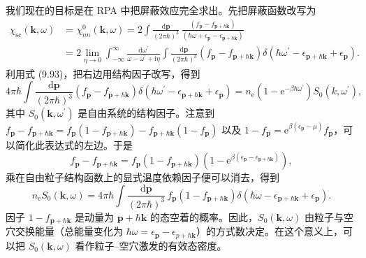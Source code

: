 我们现在的目标是在 RPA 中把屏蔽效应完全求出。先把屏蔽函数改写为
\begin{equation*}
\begin{aligned}
\chi_{\mathrm{sc}}(\mathbf{k},\omega)&=\chi_{nn}^{0}(\mathbf{k},\omega)=2\int\frac{\mathrm{d}\mathbf{p}}{(2\pi\hbar)^3}\,\frac{\left(f_{\mathbf{p}}-f_{\mathbf{p}+\hbar\mathbf{k}}\right)}{\left(\hbar\omega+\epsilon_{\mathbf{p}}-\epsilon_{\mathbf{p}+\hbar\mathbf{k}}\right)}\\
&=2\lim_{\eta\to 0}\int_{-\infty}^{\infty}\frac{\mathrm{d}\omega^{\prime}}{\omega-\omega^{\prime}+\mathrm{i}\eta}\int\frac{\mathrm{d}\mathbf{p}}{(2\pi\hbar)^3}\left(f_{\mathbf{p}}-f_{\mathbf{p}+\hbar\mathbf{k}}\right)\delta(\hbar\omega^{\prime}-\epsilon_{\mathbf{p}+\hbar\mathbf{k}}+\epsilon_{\mathbf{p}}).
\end{aligned}\tag{9.101}
\end{equation*}
利用式 (9.93)，把右边用结构因子改写，得到
\begin{equation*}
4\pi\hbar\int\frac{\mathrm{d}\mathbf{p}}{(2\pi\hbar)^3}\left(f_{\mathbf{p}}-f_{\mathbf{p}+\hbar\mathbf{k}}\right)\delta(\hbar\omega^{\prime}-\epsilon_{\mathbf{p}+\hbar\mathbf{k}}+\epsilon_{\mathbf{p}})=n_{\mathrm{e}}\left(1-\mathrm{e}^{-\beta\hbar\omega^{\prime}}\right)S_0(k,\omega^{\prime}),
\end{equation*}
其中 $S_0(\mathbf{k},\omega^{\prime})$ 是自由系统的结构因子。注意到 $f_{\mathbf{p}}-f_{\mathbf{p}+\hbar\mathbf{k}}=f_{\mathbf{p}}(1-f_{\mathbf{p}+\hbar\mathbf{k}})-f_{\mathbf{p}+\hbar\mathbf{k}}(1-f_{\mathbf{p}})$ 以及 $1-f_{\mathbf{p}}=\mathrm{e}^{\beta(\epsilon_{\mathbf{p}}-\mu)}f_{\mathbf{p}}$，可以简化此表达式的左边。于是
\begin{equation*}
f_{\mathbf{p}}-f_{\mathbf{p}+\hbar\mathbf{k}}=f_{\mathbf{p}}\left(1-f_{\mathbf{p}+\hbar\mathbf{k}}\right)\left(1-\mathrm{e}^{\beta(\epsilon_{\mathbf{p}}-\epsilon_{\mathbf{p}+\hbar\mathbf{k}})}\right),\tag{9.102}
\end{equation*}
乘在自由粒子结构函数上的显式温度依赖因子便可以消去，得到
\begin{equation*}
n_{\mathrm{e}}S_0(\mathbf{k},\omega)=4\pi\hbar\int\frac{\mathrm{d}\mathbf{p}}{(2\pi\hbar)^3}\,f_{\mathbf{p}}\left(1-f_{\mathbf{p}+\hbar\mathbf{k}}\right)\delta(\hbar\omega-\epsilon_{\mathbf{p}+\hbar\mathbf{k}}+\epsilon_{\mathbf{p}}).\tag{9.103}
\end{equation*}
因子 $1-f_{\mathbf{p}+\hbar\mathbf{k}}$ 是动量为 $\mathbf{p}+\hbar\mathbf{k}$ 的态空着的概率。因此，$S_0(\mathbf{k},\omega)$ 由粒子与空穴交换能量（总能量变化为 $\hbar\omega=\epsilon_{\mathbf{p}}-\epsilon_{p+\hbar\mathbf{k}}$）的方式数决定。在这个意义上，可以把 $S_0(\mathbf{k},\omega)$ 看作粒子–空穴激发的有效态密度。

